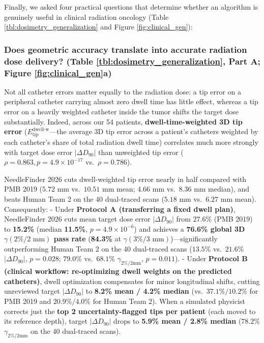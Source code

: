 \documentclass[
  11pt,
]{article}
\begin{document}
Finally, we asked four practical questions that determine whether an
algorithm is genuinely useful in clinical radiation oncology (Table
\ref{tbl:dosimetry_generalization} and Figure \ref{fig:clinical_gen}):

\subsubsection{\texorpdfstring{Does geometric accuracy translate into
accurate radiation dose delivery? (Table
\ref{tbl:dosimetry_generalization}, Part A; Figure
\ref{fig:clinical_gen}a)}{Does geometric accuracy translate into accurate radiation dose delivery? (Table , Part A; Figure a)}}\label{does-geometric-accuracy-translate-into-accurate-radiation-dose-delivery-table-part-a-figure-a}

Not all catheter errors matter equally to the radiation dose: a tip
error on a peripheral catheter carrying almost zero dwell time has
little effect, whereas a tip error on a heavily weighted catheter inside
the tumor shifts the target dose substantially. Indeed, across our 54
patients, \textbf{dwell-time-weighted 3D tip error}
(\(E_{\text{tip}}^{\text{dwell-w}}\)---the average 3D tip error across a
patient's catheters weighted by each catheter's share of total radiation
dwell time) correlates much more strongly with target dose error
\(|\Delta D_{90}|\) than unweighted tip error
(\(\rho = 0.863, p = 4.9 \times 10^{-17}\) vs.~\(\rho = 0.786\)).

NeedleFinder 2026 cuts dwell-weighted tip error nearly in half compared
with PMB 2019 (\(5.72\text{ mm}\) vs.~\(10.51\text{ mm}\) mean;
\(4.66\text{ mm}\) vs.~\(8.36\text{ mm}\) median), and beats Human Team
2 on the 40 dual-traced scans (\(5.18\text{ mm}\) vs.~\(6.27\text{ mm}\)
mean). Consequently: - Under \textbf{Protocol A (transferring a fixed
dwell plan)}, NeedleFinder 2026 cuts mean target dose error
\(|\Delta D_{90}|\) from \(27.6\%\) (PMB 2019) to \textbf{15.2\%}
(median \textbf{11.5\%}, \(p = 4.9 \times 10^{-6}\)) and achieves a
\textbf{76.6\% global 3D \(\gamma(2\%/2\text{ mm})\) pass rate}
(\textbf{84.3\%} at \(\gamma(3\%/3\text{ mm})\))---significantly
outperforming Human Team 2 on the 40 dual-traced scans (\(13.5\%\)
vs.~\(21.6\%\) \(|\Delta D_{90}|\), \(p = 0.028\); \(79.0\%\)
vs.~\(68.1\%\) \(\gamma_{2\%/2\text{mm}}\), \(p = 0.011\)). - Under
\textbf{Protocol B (clinical workflow: re-optimizing dwell weights on
the predicted catheters)}, dwell optimization compensates for minor
longitudinal shifts, cutting unreviewed target \(|\Delta D_{90}|\) to
\textbf{8.2\% mean / 4.2\% median} (vs.~\(37.1\% / 10.2\%\) for PMB 2019
and \(20.9\% / 4.0\%\) for Human Team 2). When a simulated physicist
corrects just the \textbf{top 2 uncertainty-flagged tips per patient}
(each moved to its reference depth), target \(|\Delta D_{90}|\) drops to
\textbf{5.9\% mean / 2.8\% median} (\(78.2\%\)
\(\gamma_{2\%/2\text{mm}}\) on the 40 dual-traced scans).
\end{document}
